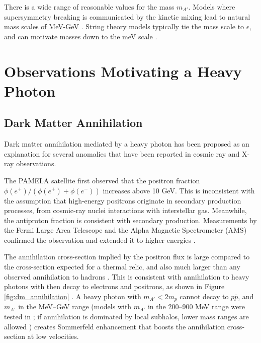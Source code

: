 There is a wide range of reasonable values for the mass $m_{A'}$.
Models where supersymmetry breaking is communicated by the kinetic mixing lead to natural mass scales of MeV-GeV \cite{baumgart_non-abelian_2009, morrissey_abelian_2009, cheung_kinetic_2009}.
String theory models typically tie the mass scale to $\epsilon$, and can motivate masses down to the meV scale \cite{goodsell_naturally_2009,cicoli_testing_2011}.

%


%
%

\section{Observations Motivating a Heavy Photon}

\subsection{Dark Matter Annihilation}

Dark matter annihilation mediated by a heavy photon has been proposed as an explanation for several anomalies that have been reported in cosmic ray and X-ray observations.

The PAMELA satellite first observed that the positron fraction $\phi(e^+)/(\phi(e^+)+\phi(e^-))$ increases above 10 GeV.
This is inconsistent with the assumption that high-energy positrons originate in secondary production processes, from cosmic-ray nuclei interactions with interstellar gas.
Meanwhile, the antiproton fraction is consistent with secondary production.
Measurements by the Fermi Large Area Telescope and the Alpha Magnetic Spectrometer (AMS) confirmed the observation and extended it to higher energies \cite{the_fermi_lat_collaboration_measurement_2012,ams_collaboration_first_2013}.

The annihilation cross-section implied by the positron flux is large compared to the cross-section expected for a thermal relic, and also much larger than any observed annihilation to hadrons \cite{cholis_high_2009}.
This is consistent with annihilation to heavy photons with then decay to electrons and positrons, as shown in Figure \ref{fig:dm_annihilation} \cite{arkani-hamed_theory_2009}.
A heavy photon with $m_{A'}<2m_p$ cannot decay to $p\bar{p}$, and $m_{A'}$ in the MeV--GeV range (models with $m_{A'}$ in the 200--900 MeV range were tested in \cite{finkbeiner_consistent_2011}; if annihilation is dominated by local subhalos, lower mass ranges are allowed \cite{slatyer_sommerfeld-enhanced_2012}) creates Sommerfeld enhancement that boosts the annihilation cross-section at low velocities.

